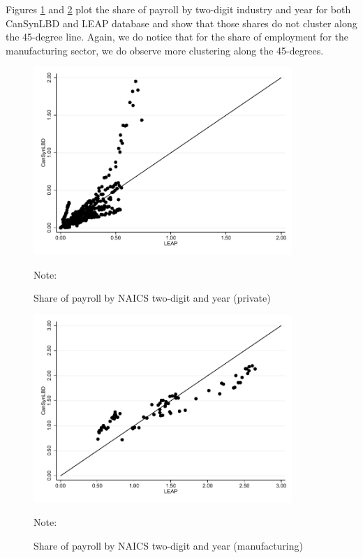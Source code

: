 Figures \ref{PayrollSharePrivate} and \ref{PayrollShareManufacturing} plot the share of payroll by two-digit industry and year for both CanSynLBD and LEAP database and show that those shares do not cluster along the 45-degree line. Again, we do notice that for the share of employment for the manufacturing sector, we do observe more clustering along the 45-degrees.
\begin{figure} [H]
\centering
\caption{Share of payroll by NAICS two-digit and year (private)} \label{PayrollSharePrivate}
\includegraphics[height=2.8in, width=.7\linewidth]{graphs/Share_of_payroll_by_NAICS_two-digit_and_year_private_bw.pdf} 
\begin{minipage}{0.85\textwidth}
{\footnotesize Note: \TableNote \par}
\end{minipage}
\end{figure}
\vspace{-15.5pt}
\begin{figure} [H]
\centering
\caption{Share of payroll by NAICS two-digit and year (manufacturing)} \label{PayrollShareManufacturing}
\includegraphics[height=2.8in, width=.7\linewidth]{graphs/Share_of_payroll_by_NAICS_two-digit_and_year_Manufacturing_bw.pdf} 
\begin{minipage}{0.85\textwidth}
{\footnotesize Note: \TableNote \par}
\end{minipage}
\end{figure}

